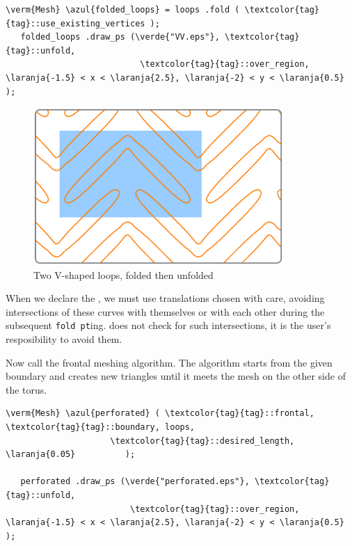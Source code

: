 \begin{Verbatim}[commandchars=\\\{\},formatcom=\small\tt,frame=single,
   rulecolor=\color{moldura},baselinestretch=0.94,framesep=2mm         ]
   \verm{Mesh} \azul{folded_loops} = loops .fold ( \textcolor{tag}{tag}::use_existing_vertices );
   folded_loops .draw_ps (\verde{"VV.eps"}, \textcolor{tag}{tag}::unfold,
                           \textcolor{tag}{tag}::over_region, \laranja{-1.5} < x < \laranja{2.5}, \laranja{-2} < y < \laranja{0.5} );
\end{Verbatim}

\begin{figure}[ht] \centering
  \includegraphics[width=95mm]{boomerang-2.eps}
  \caption{Two V-shaped loops, folded then unfolded}
  \label{\numb section 7.\numb fig 20}
\end{figure}

When we declare the {\small\tt{}}, we must use translations chosen with care,
avoiding intersections of these curves with themselves or with each other during the subsequent
\mbox{{\small\tt fold pt}ing}.
\ManiFEM{} does not check for such intersections, it is the user's resposibility to avoid them.

Now call the frontal meshing algorithm.
The algorithm starts from the given boundary and creates new triangles until
it meets the mesh on the other side of the torus.

\begin{Verbatim}[commandchars=\\\{\},formatcom=\small\tt,frame=single,
   label=code not working,rulecolor=\color{moldura},
   baselinestretch=0.94,framesep=2mm                                   ]
   \verm{Mesh} \azul{perforated} ( \textcolor{tag}{tag}::frontal, \textcolor{tag}{tag}::boundary, loops,
                     \textcolor{tag}{tag}::desired_length, \laranja{0.05}          );

   perforated .draw_ps (\verde{"perforated.eps"}, \textcolor{tag}{tag}::unfold,
                         \textcolor{tag}{tag}::over_region, \laranja{-1.5} < x < \laranja{2.5}, \laranja{-2} < y < \laranja{0.5} );
\end{Verbatim}


